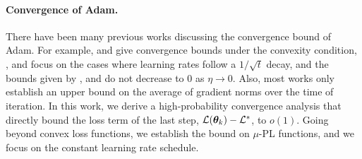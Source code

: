 \paragraph{Convergence of Adam.} There have been many previous works discussing the convergence bound of Adam. For example, \citet{reddi2018convergence} and \citet{dereich2024convergence} give convergence bounds under the convexity condition, \citet{zou2019sufficient}, \citet{shi2021rmsprop} and \citet{zhang2022adam} focus on the cases where learning rates follow a $1/\sqrt{t}$ decay, and the bounds given by \citet{NEURIPS2018_90365351}, \citet{zhang2022adam} and \citet{10.1145/3637528.3671718} do not decrease to $0$ as $\eta \to 0$. Also, most works \citep{defossez2020simple, guo2025unifiedconvergenceanalysisadaptive, iiduka2022theoreticalanalysisadamusing, wang2024convergenceadamnonuniformsmoothness, zhang2024convergence, hong2023highprobabilityconvergenceadam} only establish an upper bound on the average of gradient norms over the time of iteration. In this work, we derive a high-probability convergence analysis that directly bound the loss term of the last step, $\mathcal{L}({\bm{\theta}}_k)-\mathcal{L}^*$, to $o(1)$. Going beyond convex loss functions, we establish the bound on $\mu$-PL functions, and we focus on the constant learning rate schedule.